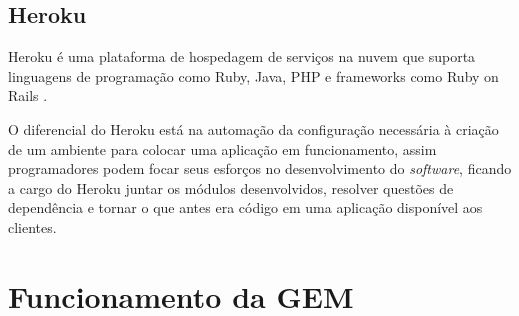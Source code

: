 \subsection{Heroku}

Heroku \'e uma plataforma de hospedagem de servi\c{c}os na nuvem que suporta linguagens de programa\c{c}\~ao como Ruby, Java, PHP e frameworks como Ruby on Rails \cite{kemp2013professional}.

O diferencial do Heroku est\'a na automa\c{c}\~ao da configura\c{c}\~ao necess\'aria \`a cria\c{c}\~ao de um ambiente para colocar uma aplica\c{c}\~ao em funcionamento, assim programadores podem focar seus esfor\c{c}os no desenvolvimento do \emph{software}, ficando a cargo do Heroku juntar os m\'odulos desenvolvidos, resolver quest\~oes de depend\^encia e tornar o que antes era c\'odigo em uma aplica\c{c}\~ao dispon\'ivel aos clientes.

\section{Funcionamento da GEM}






